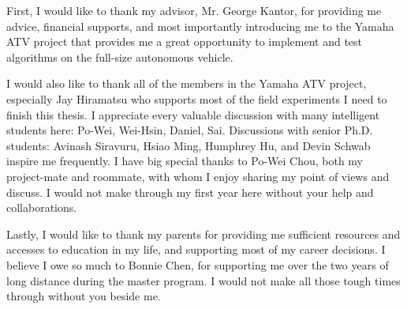 \documentclass[hidelinks, 12pt]{cmuthesis}
\begin{document}
\begin{acknowledgments}

First, I would like to thank my advisor, Mr. George Kantor, for providing me advice, financial supports, and most importantly introducing me to the Yamaha ATV project that provides me a great opportunity to implement and test algorithms on the full-size autonomous vehicle.

I would also like to thank all of the members in the Yamaha ATV project, especially Jay Hiramatsu who supports most of the field experiments I need to finish this thesis. I appreciate every valuable discussion with many intelligent students here: Po-Wei, Wei-Hsin, Daniel, Sai. Discussions with senior Ph.D. students: Avinash Siravuru, Hsiao Ming, Humphrey Hu, and Devin Schwab inspire me frequently. 
I have big special thanks to Po-Wei Chou, both my project-mate and roommate, with whom I enjoy sharing my point of views and discuss. 
I would not make through my first year here without your help and collaborations.

Lastly, I would like to thank my parents for providing me sufficient resources and accesses to education in my life, and supporting most of my career decisions. I believe I owe so much to Bonnie Chen, for supporting me over the two years of long distance during the master program. I would not make all those tough times through without you beside me.

  
\end{acknowledgments}



\tableofcontents
\listoffigures
\listoftables

\mainmatter


%
%
%
%
%
\end{document}
